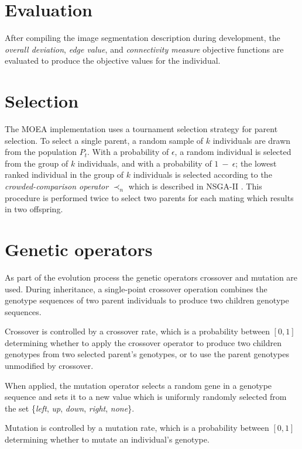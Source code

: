 \documentclass[paper=a4, fontsize=9pt]{scrartcl}
\begin{document}
\begin{multicols}{2}
\section*{Evaluation}

After compiling the image segmentation description during development, the \textit{overall deviation}, \textit{edge value}, and \textit{connectivity measure} objective functions are evaluated to produce the objective values for the individual.

\section*{Selection}

The \ac{MOEA} implementation uses a tournament selection strategy for parent selection. To select a single parent, a random sample of $k$ individuals are drawn from the population $P_t$. With a probability of $\epsilon$, a random individual is selected from the group of $k$ individuals, and with a probability of $1~-~\epsilon$; the lowest ranked individual in the group of $k$ individuals is selected according to the \textit{crowded-comparison operator} $\prec_n$ which is described in NSGA-II \cite{deb2002fast}. This procedure is performed twice to select two parents for each mating which results in two offspring.

\section*{Genetic operators}

As part of the evolution process the genetic operators crossover and mutation are used. During inheritance, a single-point crossover operation combines the genotype sequences of two parent individuals to produce two children genotype sequences.

Crossover is controlled by a crossover rate, which is a probability between $[0, 1]$ determining whether to apply the crossover operator to produce two children genotypes from two selected parent's genotypes, or to use the parent genotypes unmodified by crossover.

When applied, the mutation operator selects a random gene in a genotype sequence and sets it to a new value which is uniformly randomly selected from the set \{\textit{left}, \textit{up}, \textit{down}, \textit{right}, \textit{none}\}.

Mutation is controlled by a mutation rate, which is a probability between $[0, 1]$ determining whether to mutate an individual's genotype.


\end{multicols}
\end{document}
